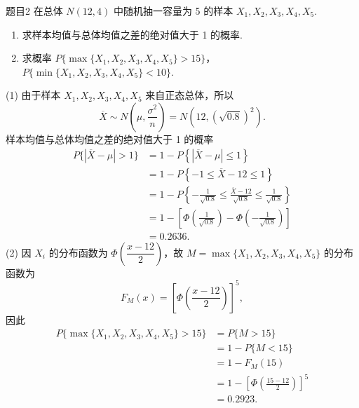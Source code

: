 \begin{question}{题目2}
    在总体 $N(12, 4)$ 中随机抽一容量为 5 的样本 $X_1, X_2, X_3, X_4, X_5$.
    \begin{enumerate}
        \item [(1)] 求样本均值与总体均值之差的绝对值大于 1 的概率.
        \item [(2)] 求概率 $P\{\max\{X_1, X_2, X_3, X_4, X_5\} > 15\}$，$P\{\min\{X_1, X_2, X_3, X_4, X_5\} < 10\}$.
    \end{enumerate}
\end{question}
\begin{solution}
    (1) 由于样本 $X_1, X_2, X_3, X_4, X_5$ 来自正态总体，所以
    $$
        \overline{X} \sim N\left(\mu, \frac{\sigma^2}{n}\right) = N\left(12, (\sqrt{0.8})^2\right).
    $$
    样本均值与总体均值之差的绝对值大于 1 的概率
    $$
        \begin{aligned}
            P\{|\overline{X} - \mu| > 1\}
             & = 1 - P\left\{\left|\overline{X} - \mu\right| \leqslant 1 \right\}                                                         \\
             & = 1 - P\left\{-1 \leqslant \overline{X}-12 \leqslant 1\right\}                                                             \\
             & = 1 - P\left\{ -\frac{1}{\sqrt{0.8}} \leqslant \frac{\overline{X} - 12}{\sqrt{0.8}} \leqslant \frac{1}{\sqrt{0.8}}\right\} \\
             & = 1 - \left[\Phi\left(\frac{1}{\sqrt{0.8}}\right) - \Phi\left(-\frac{1}{\sqrt{0.8}}\right)\right]                          \\
             & = 0.2636.
        \end{aligned}
    $$
    (2) 因 $X_i$ 的分布函数为 $\Phi\left(\dfrac{x-12}{2}\right)$，故 $M = \max\{X_1, X_2, X_3, X_4, X_5\}$ 的分布函数为
    $$
        F_M(x) = \left[\Phi\left(\frac{x-12}{2}\right)\right]^5,
    $$
    因此
    $$
        \begin{aligned}
            P\{\max\{X_1, X_2, X_3, X_4, X_5\} > 15\}
             & = P\{M > 15\}                                         \\
             & = 1 - P\{M<15\}                                       \\
             & = 1 - F_M(15)                                         \\
             & = 1 - \left[\Phi\left(\frac{15-12}{2}\right)\right]^5 \\
             & = 0.2923.
        \end{aligned}
$$
\end{solution}
